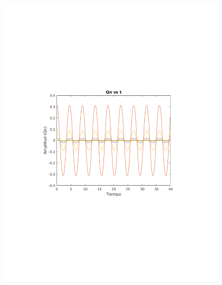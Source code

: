 \documentclass[10pt,a4paper]{article}
\begin{document}
\begin{figure}[h!]
\centering 
\includegraphics[scale=0.8]{Qn2-40.pdf}
\end{figure}
\end{document}
